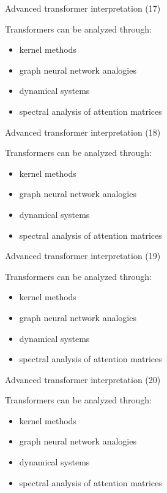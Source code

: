 \documentclass[aspectratio=169]{beamer}
\begin{document}
\begin{frame}{Advanced transformer interpretation (17)}

Transformers can be analyzed through:

\begin{itemize}
\item kernel methods
\item graph neural network analogies
\item dynamical systems
\item spectral analysis of attention matrices
\end{itemize}

\end{frame}


\begin{frame}{Advanced transformer interpretation (18)}

Transformers can be analyzed through:

\begin{itemize}
\item kernel methods
\item graph neural network analogies
\item dynamical systems
\item spectral analysis of attention matrices
\end{itemize}

\end{frame}


\begin{frame}{Advanced transformer interpretation (19)}

Transformers can be analyzed through:

\begin{itemize}
\item kernel methods
\item graph neural network analogies
\item dynamical systems
\item spectral analysis of attention matrices
\end{itemize}

\end{frame}


\begin{frame}{Advanced transformer interpretation (20)}

Transformers can be analyzed through:

\begin{itemize}
\item kernel methods
\item graph neural network analogies
\item dynamical systems
\item spectral analysis of attention matrices
\end{itemize}

\end{frame}
\end{document}
